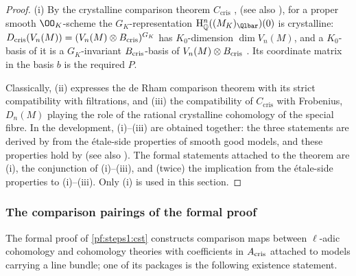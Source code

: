 \begin{proof}
(i) By the crystalline comparison theorem $C_{\mathrm{cris}}$ \cite{FontaineMessing1987,Faltings1989}, \cite{Tsuji1999}
(see also \cite{BhattMorrowScholze2018}), for a proper smooth $\OO_K$-scheme the $G_K$-representation
$\stepsIHQ^n((M_K)_{\Qlbar})(0)$ is crystalline: $D_{\mathrm{cris}}(V_n(M))=(V_n(M)\otimes B_{\mathrm{cris}})^{G_K}$ has $K_0$-dimension
$\dim V_n(M)$, and a $K_0$-basis of it is a $G_K$-invariant $B_{\mathrm{cris}}$-basis of $V_n(M)\otimes B_{\mathrm{cris}}$
\cite[Exp.~III]{Fontaine1994rss}. Its coordinate matrix in the basis $b$ is the required $P$.

Classically, (ii) expresses the de Rham comparison theorem \cite{Faltings1988,Scholze2013phodge} with its strict
compatibility with filtrations, and (iii) the compatibility of $C_{\mathrm{cris}}$ with Frobenius, $D_n(M)$ playing the role
of the rational crystalline cohomology of the special fibre. In the development, (i)--(iii) are obtained together: the
three statements are derived by  from the \'etale-side
properties of smooth good models, and these properties hold by  (see also
). The formal statements attached to the theorem are (i),
the conjunction of (i)--(iii), and (twice) the implication from the \'etale-side properties to (i)--(iii). Only (i) is used
in this section.
\end{proof}

\subsubsection{The comparison pairings of the formal proof}\label{sec:pf:steps1:pseam}

The formal proof of \cref{pf:steps1:cst} constructs comparison maps between $\ell$-adic cohomology and cohomology
theories with coefficients in $A_{\mathrm{cris}}$ attached to models carrying a line bundle; one of its packages is the
following existence statement.

